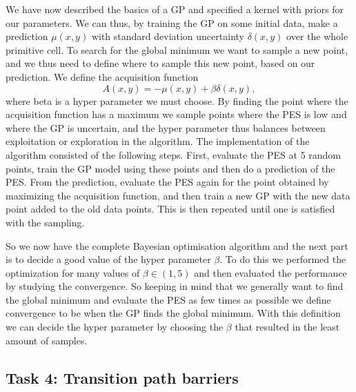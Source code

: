 \documentclass[11pt,a4paper]{article}
\begin{document}
We have now described the basics of a GP and specified a kernel with priors for our parameters. We can thus, by training the GP on some initial data, make a prediction $\mu(x,y)$ with standard deviation uncertainty $\delta(x,y)$ over the whole primitive cell. To search for the global minimum we want to sample a new point, and we thus need to define where to sample this new point, based on our prediction. We define the acquisition function
\begin{equation}
    \label{eq:acquisition_function}
    A(x,y) = -\mu(x,y) + \beta \delta(x,y),
\end{equation}
where beta is a hyper parameter we must choose. By finding the point where the acquisition function has a maximum we sample points where the PES is low and where the GP is uncertain, and the hyper parameter thus balances between exploitation or exploration in the algorithm. The implementation of the algorithm consisted of the following steps. First, evaluate the PES at 5 random points, train the GP model using these points and then do a prediction of the PES. From the prediction, evaluate the PES again for the point obtained by maximizing the acquisition function, and then train a new GP with the new data point added to the old data points. This is then repeated until one is satisfied with the sampling.  

So we now have the complete Bayesian optimisation algorithm and the next part is to decide a good value of the hyper parameter $\beta$. To do this we performed the optimization for many values of $\beta \in (1,5)$ and then evaluated the performance by studying the convergence. So keeping in mind that we generally want to find the global minimum and evaluate the PES as few times as possible we define convergence to be when the GP finds the global minimum. With this definition we can decide the hyper parameter by choosing the $\beta$ that resulted in the least amount of samples. 





















\subsection[Task 4]{Task 4: Transition path barriers}
\label{sec:method_task4}
\end{document}
